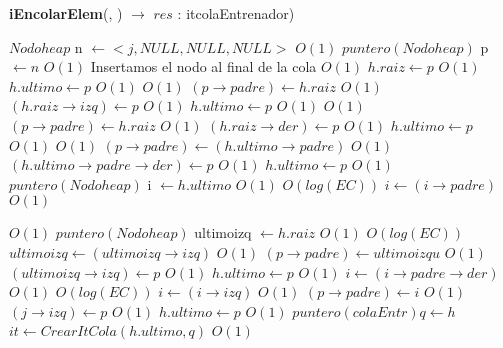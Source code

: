 \begin{Algoritmos}
[H]{\textbf{iEncolarElem}(, ) $\to$ $res$ : itcolaEntrenador)}
    	\begin{algorithmic}[1]
    	\State $Nodoheap$ n $\gets <j, NULL, NULL, NULL>$ \Comment $O(1)$
    	\State $puntero(Nodoheap)$ p $\gets n$  \Comment $O(1)$
		 \Comment Insertamos el nodo al final de la cola $O(1)$
    		\State $h.raiz \gets p$ \Comment $O(1)$
    		\State $h.ultimo \gets p$ \Comment $O(1)$
    	\Else
    		 \Comment $O(1)$
    			\State $(p \rightarrow padre) \gets h.raiz$ \Comment $O(1)$
    			\State $(h.raiz \rightarrow izq) \gets p$ \Comment $O(1)$
    			\State $h.ultimo \gets p$    \Comment $O(1)$
    		\Else
    			 \Comment $O(1)$
    				\State $(p \rightarrow padre) \gets h.raiz$ \Comment $O(1)$
    				\State $(h.raiz \rightarrow der) \gets p$ \Comment $O(1)$
    				\State $h.ultimo \gets p$ \Comment $O(1)$
    			\Else
    				 \Comment $O(1)$
    					\State $(p \rightarrow padre) \gets (h.ultimo \rightarrow padre)$ \Comment $O(1)$
    					\State $(h.ultimo \rightarrow padre \rightarrow der) \gets p$ \Comment $O(1)$
    					\State $h.ultimo \gets p$ \Comment $O(1)$
    				\Else
						\State $puntero(Nodoheap)$ i $\gets h.ultimo$    				 \Comment $O(1)$	
    					 \Comment $O(log(EC))$
    						\State $i \gets (i \rightarrow padre)$ \Comment $O(1)$
    					
    					\EndWhile
    					 \Comment $O(1)$
    						\State $puntero(Nodoheap)$ ultimoizq $\gets h.raiz$ \Comment $O(1)$
    						 \Comment $O(log(EC))$
    							\State $ultimoizq \gets (ultimoizq \rightarrow izq)$ \Comment $O(1)$
    						\EndWhile
    						\State $(p \rightarrow padre) \gets ultimoizqu$ \Comment $O(1)$
    						\State $(ultimoizq \rightarrow izq) \gets p$ \Comment $O(1)$
    						\State $h.ultimo \gets p$ \Comment $O(1)$
    					\Else
    						\State $i \gets (i \rightarrow padre \rightarrow der)$ \Comment $O(1)$
    						 \Comment $O(log(EC))$
    							\State $i \gets (i \rightarrow izq)$ \Comment $O(1)$
    						\EndWhile
    						\State $(p \rightarrow padre) \gets i$ \Comment $O(1)$
    						\State $(j \rightarrow izq) \gets p$ \Comment $O(1)$
    						\State $h.ultimo \gets p$ \Comment $O(1)$
    					\EndIf
    				\EndIf		
    			\EndIf	    	
	    	\EndIf
		\EndIf
		\State $puntero(colaEntr) q \gets h$
		\State $it \gets CrearItCola(h.ultimo, q)$ \Comment $O(1)$


\end{algorithmic}
\end{Algoritmos}
